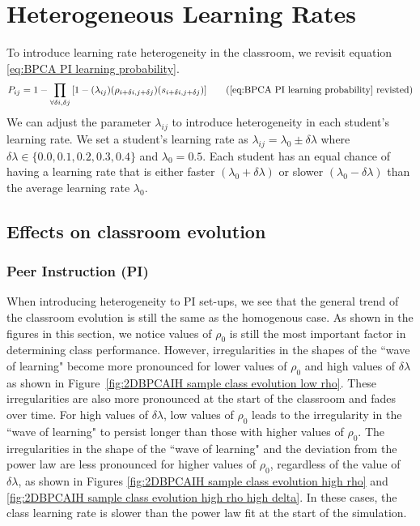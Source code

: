 \chapter{Heterogeneous Learning Rates}

To introduce learning rate heterogeneity in the classroom, we revisit equation \ref{eq:BPCA PI learning probability}. 
\begin{equation*}
    P_{ij} = 1 - \prod_{\forall \delta i, \delta j}{\lbrack1-(\lambda_{ij})(\rho_{i+\delta i, j+\delta j})(s_{i+\delta i, j+\delta j})}\rbrack
    \tag{\ref{eq:BPCA PI learning probability} revisted}
\end{equation*}
We can adjust the parameter $\lambda_{ij}$ to introduce heterogeneity in each student's learning rate. 
We set a student's learning rate as $\lambda_{ij} = \lambda_0 \pm \delta\lambda$ where $\delta\lambda \in \lbrace 0.0,0.1, 0.2, 0.3, 0.4\rbrace$ and $\lambda_0 = 0.5$. 
Each student has an equal chance of having a learning rate that is either faster $(\lambda_0 + \delta\lambda)$ or slower $(\lambda_0 - \delta\lambda)$ than the average learning rate $\lambda_0$.  

\section{Effects on classroom evolution}\label{sec:BPCAIH effects on classroom evolution}
\subsection{Peer Instruction (PI)}\label{sec:BPCAIH effects on classroom evolution PI}
When introducing heterogeneity to PI set-ups, we see that the general trend of the classroom evolution is still the same as the homogenous case.
As shown in the figures in this section, we notice values of $\rho_0$ is still the most important factor in determining class performance. 
However, irregularities in the shapes of the ``wave of learning" become more pronounced for lower values of $\rho_0$ and high values of $\delta\lambda$ as shown in Figure~\ref{fig:2DBPCAIH sample class evolution low rho}.
These irregularities are also more pronounced at the start of the classroom and fades over time.
For high values of $\delta\lambda$, low values of $\rho_0$ leads to the irregularity in the ``wave of learning" to persist longer than those with higher values of $\rho_0$.
The irregularities in the shape of the ``wave of learning" and the deviation from the power law are less pronounced for higher values of $\rho_0$, regardless of the value of $\delta\lambda$, as shown in Figures \ref{fig:2DBPCAIH sample class evolution high rho} and \ref{fig:2DBPCAIH sample class evolution high rho high delta}.
In these cases, the class learning rate is slower than the power law fit at the start of the simulation.

